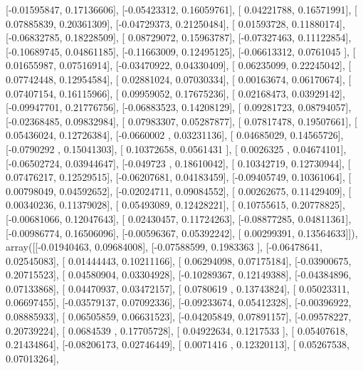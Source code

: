 \documentclass{article}
\begin{document}
       [-0.01595847,  0.17136606],
       [-0.05423312,  0.16059761],
       [ 0.04221788,  0.16571991],
       [ 0.07885839,  0.20361309],
       [-0.04729373,  0.21250484],
       [ 0.01593728,  0.11880174],
       [-0.06832785,  0.18228509],
       [ 0.08729072,  0.15963787],
       [-0.07327463,  0.11122854],
       [-0.10689745,  0.04861185],
       [-0.11663009,  0.12495125],
       [-0.06613312,  0.0761045 ],
       [ 0.01655987,  0.07516914],
       [-0.03470922,  0.04330409],
       [ 0.06235099,  0.22245042],
       [ 0.07742448,  0.12954584],
       [ 0.02881024,  0.07030334],
       [ 0.00163674,  0.06170674],
       [ 0.07407154,  0.16115966],
       [ 0.09959052,  0.17675236],
       [ 0.02168473,  0.03929142],
       [-0.09947701,  0.21776756],
       [-0.06883523,  0.14208129],
       [ 0.09281723,  0.08794057],
       [-0.02368485,  0.09832984],
       [ 0.07983307,  0.05287877],
       [ 0.07817478,  0.19507661],
       [ 0.05436024,  0.12726384],
       [-0.0660002 ,  0.03231136],
       [ 0.04685029,  0.14565726],
       [-0.0790292 ,  0.15041303],
       [ 0.10372658,  0.0561431 ],
       [ 0.0026325 ,  0.04674101],
       [-0.06502724,  0.03944647],
       [-0.049723  ,  0.18610042],
       [ 0.10342719,  0.12730944],
       [ 0.07476217,  0.12529515],
       [-0.06207681,  0.04183459],
       [-0.09405749,  0.10361064],
       [ 0.00798049,  0.04592652],
       [-0.02024711,  0.09084552],
       [ 0.00262675,  0.11429409],
       [ 0.00340236,  0.11379028],
       [ 0.05493089,  0.12428221],
       [ 0.10755615,  0.20778825],
       [-0.00681066,  0.12047643],
       [ 0.02430457,  0.11724263],
       [-0.08877285,  0.04811361],
       [-0.00986774,  0.16506096],
       [-0.00596367,  0.05392242],
       [ 0.00299391,  0.13564633]]), array([[-0.01940463,  0.09684008],
       [-0.07588599,  0.1983363 ],
       [-0.06478641,  0.02545083],
       [ 0.01444443,  0.10211166],
       [ 0.06294098,  0.07175184],
       [-0.03900675,  0.20715523],
       [ 0.04580904,  0.03304928],
       [-0.10289367,  0.12149388],
       [-0.04384896,  0.07133868],
       [ 0.04470937,  0.03472157],
       [ 0.0780619 ,  0.13743824],
       [ 0.05023311,  0.06697455],
       [-0.03579137,  0.07092336],
       [-0.09233674,  0.05412328],
       [-0.00396922,  0.08885933],
       [ 0.06505859,  0.06631523],
       [-0.04205849,  0.07891157],
       [-0.09578227,  0.20739224],
       [ 0.0684539 ,  0.17705728],
       [ 0.04922634,  0.1217533 ],
       [ 0.05407618,  0.21434864],
       [-0.08206173,  0.02746449],
       [ 0.0071416 ,  0.12320113],
       [ 0.05267538,  0.07013264],
\end{document}
